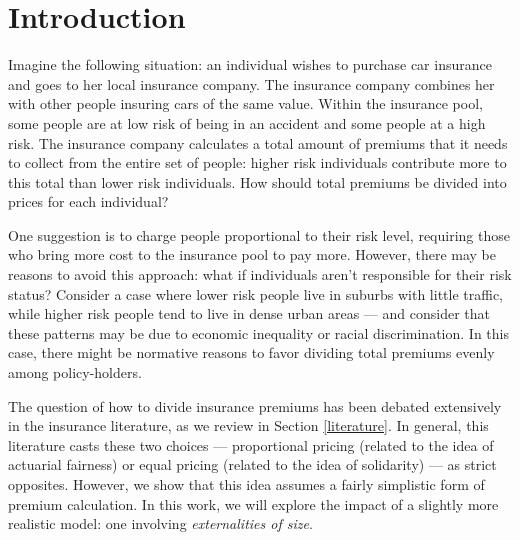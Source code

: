\documentclass[sigconf]{acmart}
\begin{document}



\maketitle

\section{Introduction}

Imagine the following situation: an individual wishes to purchase car insurance and goes to her local insurance company. The insurance company combines her with other people insuring cars of the same value. Within the insurance pool, some people are at low risk of being in an accident and some people at a high risk. The insurance company calculates a total amount of premiums that it needs to collect from the entire set of people: higher risk individuals contribute more to this total than lower risk individuals. How should total premiums be divided into prices for each individual?

One suggestion is to charge people proportional to their risk level, requiring those who bring more cost to the insurance pool to pay more. However, there may be reasons to avoid this approach: what if individuals aren't responsible for their risk status? Consider a case where lower risk people live in suburbs with little traffic, while higher risk people tend to live in dense urban areas --- and consider that these patterns may be due to economic inequality or racial discrimination. In this case, there might be normative reasons to favor dividing total premiums evenly among policy-holders. 

The question of how to divide insurance premiums has been debated extensively in the insurance literature, as we review in Section \ref{literature}. In general, this literature casts these two choices --- proportional pricing (related to the idea of actuarial fairness) or equal pricing (related to the idea of solidarity) --- as strict opposites. However, we show that this idea assumes a fairly simplistic form of premium calculation. In this work, we will explore the impact of a slightly more realistic model: one involving \emph{externalities of size}. 
\end{document}
